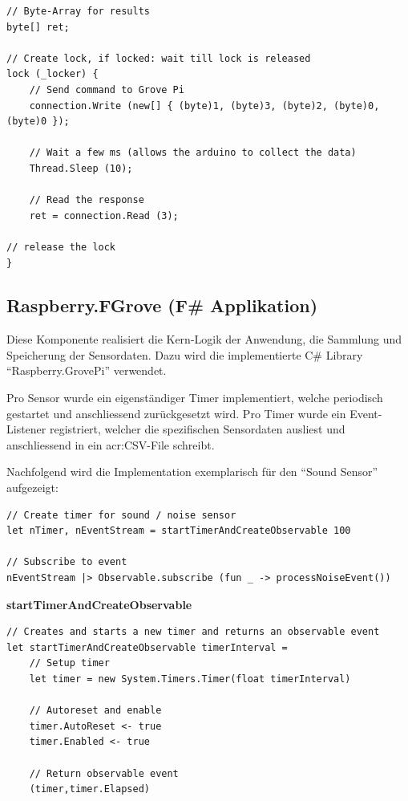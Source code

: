 \begin{lstlisting}
// Byte-Array for results
byte[] ret; 

// Create lock, if locked: wait till lock is released
lock (_locker) { 
	// Send command to Grove Pi
	connection.Write (new[] { (byte)1, (byte)3, (byte)2, (byte)0, (byte)0 }); 
	
	// Wait a few ms (allows the arduino to collect the data)
	Thread.Sleep (10); 
	
	// Read the response
	ret = connection.Read (3); 
	
// release the lock
} 
\end{lstlisting}


\subsection{Raspberry.FGrove (F\# Applikation)}
Diese Komponente realisiert die Kern-Logik der Anwendung, die Sammlung und Speicherung der Sensordaten. Dazu wird die implementierte C\# Library "`Raspberry.GrovePi"' verwendet.

Pro Sensor wurde ein eigenständiger Timer implementiert, welche periodisch gestartet und anschliessend zurückgesetzt wird. Pro Timer wurde ein Event-Listener registriert, welcher die spezifischen Sensordaten ausliest und anschliessend in ein \gls{acr:CSV}-File schreibt.

Nachfolgend wird die Implementation exemplarisch für den "`Sound Sensor"' aufgezeigt:
\begin{lstlisting}
// Create timer for sound / noise sensor
let nTimer, nEventStream = startTimerAndCreateObservable 100 

// Subscribe to event
nEventStream |> Observable.subscribe (fun _ -> processNoiseEvent())
\end{lstlisting}

\textbf{startTimerAndCreateObservable}
\begin{lstlisting}
// Creates and starts a new timer and returns an observable event
let startTimerAndCreateObservable timerInterval =
    // Setup timer
    let timer = new System.Timers.Timer(float timerInterval)

    // Autoreset and enable
    timer.AutoReset <- true
    timer.Enabled <- true

    // Return observable event
    (timer,timer.Elapsed)
\end{lstlisting} 

